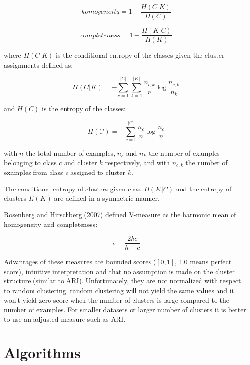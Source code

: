 \documentclass[conference]{IEEEtran}
\begin{document}
\begin{equation}
\label{homogeneity}
homogeneity = 1 - \frac{H(C|K)}{H(C)}
\end{equation}

\begin{equation}
\label{completeness}
completeness = 1 - \frac{H(K|C)}{H(K)}
\end{equation}

where $H(C|K)$ is the conditional entropy of the classes given the cluster assignments defined as:

\begin{equation}
\label{hck}
H(C|K) = - \sum\limits_{c=1}^{|C|}\sum\limits_{k=1}^{|K|}\frac{n_{c,k}}{n} \log{\frac{n_{c,k}}{n_k}}
\end{equation}

and $H(C)$ is the entropy of the classes:

\begin{equation}
\label{hc}
H(C) = - \sum\limits_{c=1}^{|C|}\frac{n_c}{n} \log{\frac{n_c}{n}}
\end{equation}

with $n$ the total number of examples, $n_c$ and $n_k$ the number of examples belonging to class
$c$ and cluster $k$ respectively, and with $n_{c,k}$ the number of examples from class $c$ assigned
to cluster $k$.

The conditional entropy of clusters given class $H(K|C)$ and the entropy of clusters $H(K)$ are
defined in a symmetric manner.

Rosenberg and Hirschberg (2007) defined V-measure as the harmonic mean of homogeneity and completeness:

\begin{equation}
\label{v}
v = \frac{2hc}{h+c}
\end{equation}

Advantages of these measures are bounded scores ($[0, 1]$, 1.0 means perfect score), intuitive interpretation and that
no assumption is made on the cluster structure (similar to ARI). Unfortunately, they are not normalized
with respect to random clustering: random clustering will not yield the same values and it won't
yield zero score when the number of clusters is large compared to the number of examples. For smaller
datasets or larger number of clusters it is better to use an adjusted measure such as ARI.

\section{Algorithms}
\end{document}
